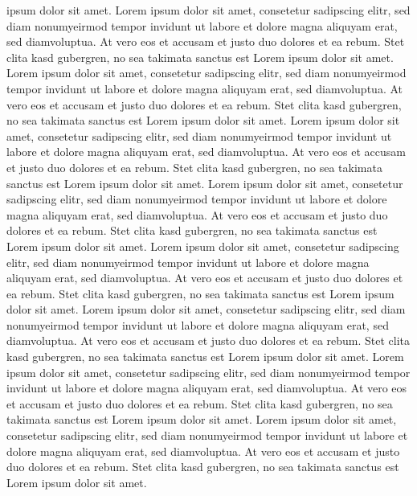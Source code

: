 \documentclass[
	a4paper,%
	oneside,%
	12pt,%
	halfparskip,%
	headinclude,%
	headsepline,%
	plainheadsepline,
	footsepline, %
	plainfootsepline,
	bibtotoc,%
	liststotoc,%
	toc=bibliography,
	]{scrbook}
\begin{document}
ipsum dolor sit amet. Lorem ipsum dolor sit amet, consetetur sadipscing
elitr, sed diam nonumyeirmod tempor invidunt ut labore et dolore magna
aliquyam erat, sed diamvoluptua. At vero eos et accusam et justo duo
dolores et ea rebum. Stet clita kasd gubergren, no sea takimata sanctus
est Lorem ipsum dolor sit amet. Lorem ipsum dolor sit amet, consetetur
sadipscing elitr, sed diam nonumyeirmod tempor invidunt ut labore et
dolore magna aliquyam erat, sed diamvoluptua. At vero eos et accusam et
justo duo dolores et ea rebum. Stet clita kasd gubergren, no sea
takimata sanctus est Lorem ipsum dolor sit amet. Lorem ipsum dolor sit
amet, consetetur sadipscing elitr, sed diam nonumyeirmod tempor
invidunt ut labore et dolore magna aliquyam erat, sed diamvoluptua. At
vero eos et accusam et justo duo dolores et ea rebum. Stet clita kasd
gubergren, no sea takimata sanctus est Lorem ipsum dolor sit amet.
Lorem ipsum dolor sit amet, consetetur sadipscing elitr, sed diam
nonumyeirmod tempor invidunt ut labore et dolore magna aliquyam erat,
sed diamvoluptua. At vero eos et accusam et justo duo dolores et ea
rebum. Stet clita kasd gubergren, no sea takimata sanctus est Lorem
ipsum dolor sit amet. Lorem ipsum dolor sit amet, consetetur sadipscing
elitr, sed diam nonumyeirmod tempor invidunt ut labore et dolore magna
aliquyam erat, sed diamvoluptua. At vero eos et accusam et justo duo
dolores et ea rebum. Stet clita kasd gubergren, no sea takimata sanctus
est Lorem ipsum dolor sit amet. Lorem ipsum dolor sit amet, consetetur
sadipscing elitr, sed diam nonumyeirmod tempor invidunt ut labore et
dolore magna aliquyam erat, sed diamvoluptua. At vero eos et accusam et
justo duo dolores et ea rebum. Stet clita kasd gubergren, no sea
takimata sanctus est Lorem ipsum dolor sit amet. Lorem ipsum dolor sit
amet, consetetur sadipscing elitr, sed diam nonumyeirmod tempor
invidunt ut labore et dolore magna aliquyam erat, sed diamvoluptua. At
vero eos et accusam et justo duo dolores et ea rebum. Stet clita kasd
gubergren, no sea takimata sanctus est Lorem ipsum dolor sit amet.
Lorem ipsum dolor sit amet, consetetur sadipscing elitr, sed diam
nonumyeirmod tempor invidunt ut labore et dolore magna aliquyam erat,
sed diamvoluptua. At vero eos et accusam et justo duo dolores et ea
rebum. Stet clita kasd gubergren, no sea takimata sanctus est Lorem
ipsum dolor sit amet.




\appendix{}

\backmatter{}



\end{document}
